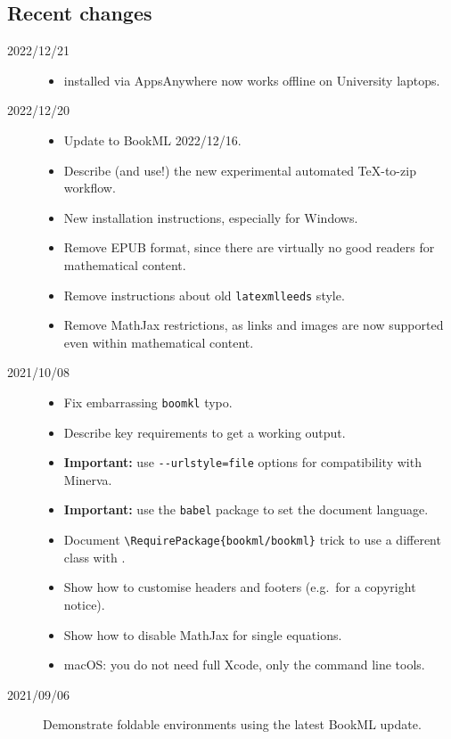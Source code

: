\documentclass[a4paper]{article}
\def\ltxinline{\lstinline[style=latexml,frame=none]}
\theoremstyle{definition}
\begin{document}
\subsection*{Recent changes}
\begin{description}
  \item[2022/12/21]
    \begin{itemize}
      \item \LaTeXML{} installed via AppsAnywhere now works offline on University laptops.
    \end{itemize}
  \item[2022/12/20]
    \begin{itemize}
      \item Update to BookML 2022/12/16.
      \item Describe (and use!) the new experimental automated \TeX{}-to-zip workflow.
      \item New installation instructions, especially for Windows.
      \item Remove EPUB format, since there are virtually no good readers for mathematical content.
      \item Remove instructions about old \texttt{latexmlleeds} style.
      \item Remove MathJax restrictions, as links and images are now supported even within mathematical content.
    \end{itemize}
  \item[2021/10/08]
    \begin{itemize}
      \item Fix embarrassing \ltxinline|boomkl| typo.
      \item Describe key requirements to get a working output.
      \item \textbf{Important:} use \ltxinline|--urlstyle=file| options for compatibility with Minerva.
      \item \textbf{Important:} use the \ltxinline|babel| package to set the document language.
      \item Document \ltxinline|\RequirePackage{bookml/bookml}| trick to use a different class with \LaTeXML{}.
      \item Show how to customise headers and footers (e.g.\ for a copyright notice).
      \item Show how to disable MathJax for single equations.
      \item macOS: you do not need full Xcode, only the command line tools.
    \end{itemize}
  \item[2021/09/06] Demonstrate foldable environments using the latest BookML update.
  \end{description}
\end{document}
